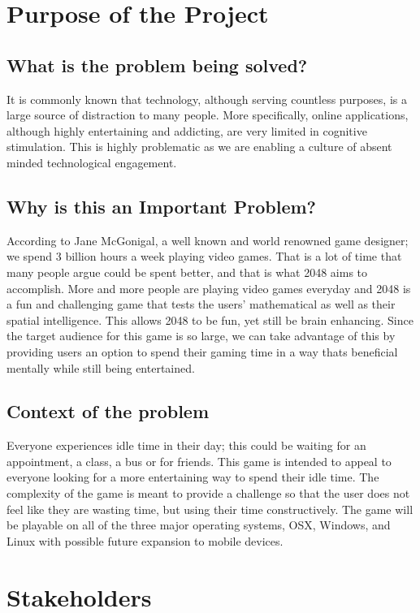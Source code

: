 \documentclass[12pt]{article}
\begin{document}
\section{Purpose of the Project}
\subsection{What is the problem being solved?}
\par\indent\indent It is commonly known that technology, although serving countless purposes, is a large source of distraction to many people. More specifically, online applications, although highly entertaining and addicting, are very limited in cognitive stimulation. This is highly problematic as we are enabling a culture of absent minded technological engagement.
\subsection{Why is this an Important Problem?}
\par\indent\indent According to Jane McGonigal, a well known and world renowned game designer; we spend 3 billion hours a week playing video games. That is a lot of time that many people argue could be spent better, and that is what 2048 aims to accomplish. More and more people are playing video games everyday and 2048 is a fun and challenging game that tests the users' mathematical as well as their spatial intelligence. This allows 2048 to be fun, yet still be brain enhancing. Since the target audience for this game is so large, we can take advantage of this by providing users an option to spend their gaming time in a way thats beneficial mentally while still being entertained.
\subsection{Context of the problem}
\par\indent\indent Everyone experiences idle time in their day; this could be waiting for an appointment, a class, a bus or for friends. This game is intended to appeal to everyone looking for a more entertaining way to spend their idle time. The complexity of the game is meant to provide a challenge so that the user does not feel like they are wasting time, but using their time constructively. The game will be playable on all of the three major operating systems, OSX, Windows, and Linux with possible future expansion to mobile devices.

\section{Stakeholders}
\end{document}

